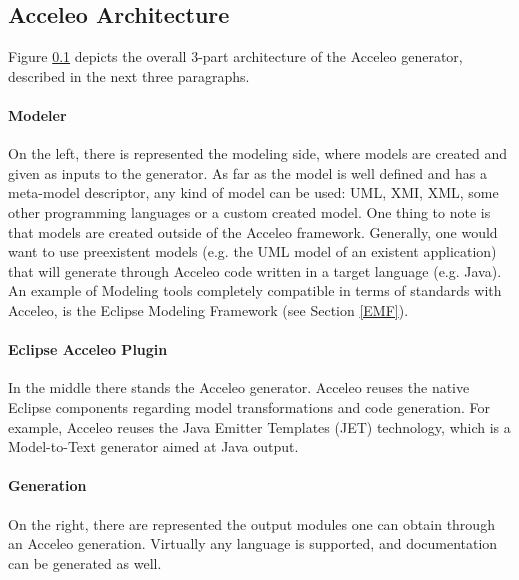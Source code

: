 \subsection{Acceleo Architecture}
\label{AcceleoArchitecture}
Figure \ref{AcceleoArchitecture} depicts the overall 3-part architecture of the Acceleo generator, described in the next three paragraphs.
\paragraph{Modeler}
On the left, there is represented the modeling side, where models are created and given as inputs to the generator. As far as the model is well defined and has a meta-model descriptor, any kind of model can be used: UML, XMI, XML, some other programming languages or a custom created model. One thing to note is that models are created outside of the Acceleo framework. Generally, one would want to use preexistent models (e.g. the UML model of an existent application) that will generate through Acceleo code written in a target language (e.g. Java). 
An example of Modeling tools completely compatible in terms of standards with Acceleo, is the Eclipse Modeling Framework (see Section \ref{EMF}).   
\paragraph{Eclipse Acceleo Plugin}
In the middle there stands the Acceleo generator. Acceleo reuses the native Eclipse components regarding model transformations and code generation. For example, Acceleo reuses the Java Emitter Templates (JET) technology, which is a Model-to-Text generator aimed at Java output.
\paragraph{Generation}
On the right, there are represented the output modules one can obtain through an Acceleo generation. Virtually any language is supported, and documentation can be generated as well.

